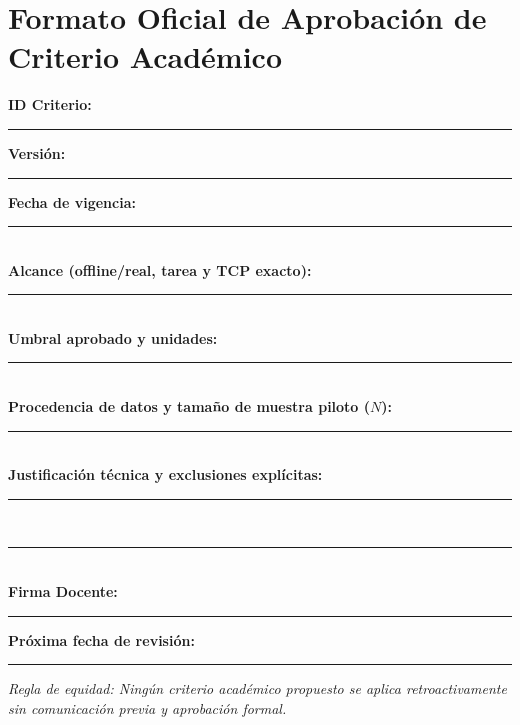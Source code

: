 \documentclass[10.5pt, a4paper]{article}
\begin{document}
\section{Formato Oficial de Aprobación de Criterio Académico}
\begin{tcolorbox}[colback=white, colframe=ucbblue, title=\textbf{Acta de Aprobación Prospectiva de Umbral (No Retroactiva)}, left=2.5mm, right=2.5mm, top=1.5mm, bottom=1.5mm]
    \footnotesize\raggedright
    \textbf{ID Criterio:} \rule{3cm}{0.15mm} \hfill \textbf{Versión:} \rule{2.5cm}{0.15mm} \hfill \textbf{Fecha de vigencia:} \rule{3cm}{0.15mm}\\[0.28cm]
    \textbf{Alcance (offline/real, tarea y TCP exacto):} \rule{9.5cm}{0.15mm}\\[0.28cm]
    \textbf{Umbral aprobado y unidades:} \rule{11.4cm}{0.15mm}\\[0.28cm]
    \textbf{Procedencia de datos y tamaño de muestra piloto ($N$):} \rule{7.8cm}{0.15mm}\\[0.28cm]
    \textbf{Justificación técnica y exclusiones explícitas:} \rule{9.2cm}{0.15mm}\\[0.28cm]
    \rule{\textwidth}{0.15mm}\\[0.28cm]
    \textbf{Firma Docente:} \rule{6cm}{0.15mm} \hfill \textbf{Próxima fecha de revisión:} \rule{3.5cm}{0.15mm}
    \par\vspace{0.15cm}\scriptsize\textit{Regla de equidad: Ningún criterio académico propuesto se aplica retroactivamente sin comunicación previa y aprobación formal.}
\end{tcolorbox}
\end{document}
